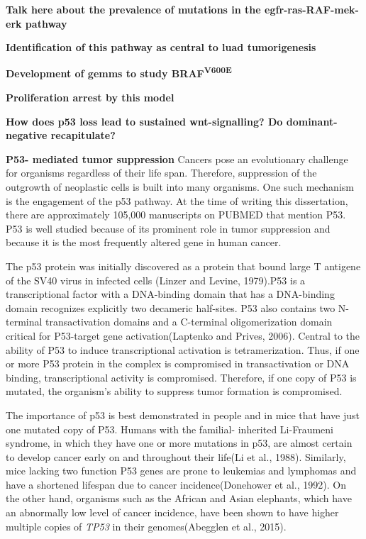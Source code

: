 \textbf{Talk here about the prevalence of mutations in the egfr-ras-RAF-mek-erk pathway}

\textbf{Identification of this pathway as central to luad tumorigenesis}

\textbf{Development of gemms to study BRAF\textsuperscript{V600E}}

\textbf{Proliferation arrest by this model}

\textbf{How does p53 loss lead to sustained wnt-signalling? Do dominant-negative recapitulate?}

\textbf{P53- mediated tumor suppression}
Cancers pose an evolutionary challenge for organisms regardless of their life span. Therefore, suppression of the outgrowth of neoplastic cells is built into many organisms. One such mechanism is the engagement of the p53 pathway. At the time of writing this dissertation, there are approximately 105,000 manuscripts on PUBMED that mention P53. P53 is well studied because of its prominent role in tumor suppression and because it is the most frequently altered gene in human cancer.

The p53 protein was initially discovered as a protein that bound large T antigene of the SV40 virus in infected cells (Linzer and Levine, 1979).P53 is a transcriptional factor with a DNA-binding domain that has a DNA-binding domain recognizes explicitly two decameric half-sites. P53 also contains two N-terminal transactivation domains and a C-terminal oligomerization domain critical for P53-target gene activation(Laptenko and Prives, 2006). Central to the ability of P53 to induce transcriptional activation is tetramerization. Thus, if one or more P53 protein in the complex is compromised in transactivation or DNA binding, transcriptional activity is compromised. Therefore, if one copy of P53 is mutated, the organism's ability to suppress tumor formation is compromised.

The importance of p53 is best demonstrated in people and in mice that have just one mutated copy of P53. Humans with the familial- inherited Li-Fraumeni syndrome, in which they have one or more mutations in p53, are almost certain to develop cancer early on and throughout their life(Li et al., 1988). Similarly, mice lacking two function P53 genes are prone to leukemias and lymphomas and have a shortened lifespan due to cancer incidence(Donehower et al., 1992). On the other hand, organisms such as the African and Asian elephants, which have an abnormally low level of cancer incidence, have been shown to have higher multiple copies of \emph{TP53} in their genomes(Abegglen et al., 2015).

